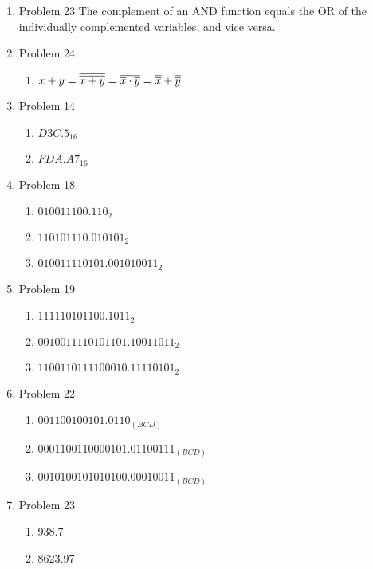 \begin{enumerate}[leftmargin=2cm,labelsep=.5cm,label=\bf\arabic*.]

\item Problem 23
The complement of an AND function equals the OR of the individually complemented variables, and vice versa.

\item Problem 24
\begin{enumerate}
  \item $x+y = \overline{\overline{x+y}} = \overline{\overline{x}\cdot\overline{y}} = \overline{\overline{x}}+\overline{\overline{y}}$
\end{enumerate}

\item Problem 14
\begin{enumerate}
  \item $D3C.5_{16}$
  \item $FDA.A7_{16}$
\end{enumerate}

\item Problem 18
\begin{enumerate}
  \item $010011100.110_2$
  \item $110101110.010101_2$
  \item $010011110101.001010011_2$
\end{enumerate}

\item Problem 19
\begin{enumerate}
  \item $111110101100.1011_2$
  \item $0010011110101101.10011011_2$
  \item $1100110111100010.11110101_2$
\end{enumerate}

\item Problem 22
\begin{enumerate}
  \item $001100100101.0110_{(BCD)}$
  \item $0001100110000101.01100111_{(BCD)}$
  \item $0010100101010100.00010011_{(BCD)}$
\end{enumerate}

\item Problem 23
\begin{enumerate}
  \item 938.7
  \item 8623.97
\end{enumerate}


\end{enumerate}
